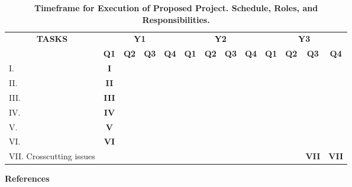 \documentclass[11pt,letterpaper]{article}
\newcommand{\x}{\cellcolor{lightgray}} %
\begin{document}
\begin{table}[h!]
    \centering
    \caption*{\textbf{Timeframe for Execution of Proposed Project. Schedule, Roles, and Responsibilities.}}
    \begin{tabular}{|l|c|c|c|c|c|c|c|c|c|c|c|c|}
        \hline
        \multicolumn{1}{|c|}{\multirow{2}{*}{\textbf{TASKS}}}& 
        \multicolumn{4}{|c|}{\textbf{Y1}}&
        \multicolumn{4}{|c|}{\textbf{Y2}}&
        \multicolumn{4}{|c|}{\textbf{Y3}}
        \\
        \cline{2-13}
        &
        \textbf{Q1}& 
        \textbf{Q2}& 
        \textbf{Q3}& 
        \textbf{Q4}& 
        \textbf{Q1}& 
        \textbf{Q2}& 
        \textbf{Q3}& 
        \textbf{Q4}& 
        \textbf{Q1}& 
        \textbf{Q2}& 
        \textbf{Q3}& 
        \textbf{Q4}
        \\
        \hline
        I. 
        &\x\textbf{I}
        & 
        & 
        & 
        & 
        & 
        & 
        & 
        & 
        & 
        & 
        & 
        \\
        \hline
        II. 
        &\x\textbf{II} 
        & 
        & 
        & 
        & 
        & 
        & 
        & 
        & 
        & 
        & 
        & 
        \\
        \hline
        III. 
        &\x\textbf{III} 
        & 
        & 
        & 
        & 
        & 
        & 
        & 
        & 
        & 
        & 
        & 
        \\
        \hline
        IV. 
        &\x\textbf{IV}
        & 
        & 
        & 
        & 
        & 
        & 
        & 
        & 
        & 
        & 
        & 
        \\
        \hline
        V. 
        &\x\textbf{V} 
        & 
        & 
        & 
        & 
        & 
        & 
        & 
        & 
        & 
        & 
        & 
        \\
        \hline
        VI. 
        &\x\textbf{VI} 
        & 
        & 
        & 
        & 
        & 
        & 
        & 
        & 
        & 
        & 
        & 
        \\
        \hline
        VII. Crosscutting issues
        & 
        & 
        & 
        & 
        & 
        & 
        & 
        & 
        & 
        & 
        &\x\textbf{VII} 
        &\x\textbf{VII} 
        \\
        \hline
    \end{tabular}
    \label{tab-timeframe}
\end{table}

\vspace{\baselineskip}

\noindent\textbf{References}

\setlength{\bibhang}{0pt}


\end{document}
